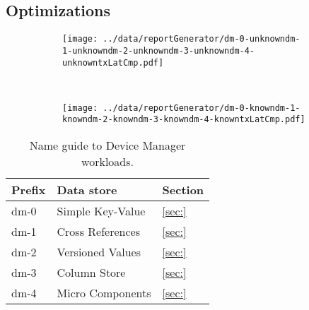 \subsection{Optimizations}
\begin{figure}
  \centering
  \begin{subfigure}[b]{0.5\textwidth}
                \centering
                \texttt{[image: ../data/reportGenerator/dm-0-unknowndm-1-unknowndm-2-unknowndm-3-unknowndm-4-unknowntxLatCmp.pdf]}
                \caption{}
                \label{}
        \end{subfigure}%
        ~
        \begin{subfigure}[b]{0.5\textwidth}
                \centering
                \texttt{[image: ../data/reportGenerator/dm-0-knowndm-1-knowndm-2-knowndm-3-knowndm-4-knowntxLatCmp.pdf]}
                \caption{}
                \label{}
        \end{subfigure}
        \caption[Device Manager performance analysis]{}
        \label{fig:dm:performance}
\end{figure}


\begin{table}
\small
\begin{tabular}{lll} 
    Prefix &  Data store & Section\\\toprule
    dm-0 & Simple Key-Value  & \ref{sec:}  \\
    dm-1 & Cross References  & \ref{sec:} \\
    dm-2 & Versioned Values & \ref{sec:} \\
    dm-3 & Column Store & \ref{sec:} \\
    dm-4 & Micro Components & \ref{sec:} \\ \bottomrule
  \end{tabular}
  \caption[Name guide to Device Manager workloads]{Name guide to
    Device Manager workloads.}
  \label{table:names:dm}
\end{table}



